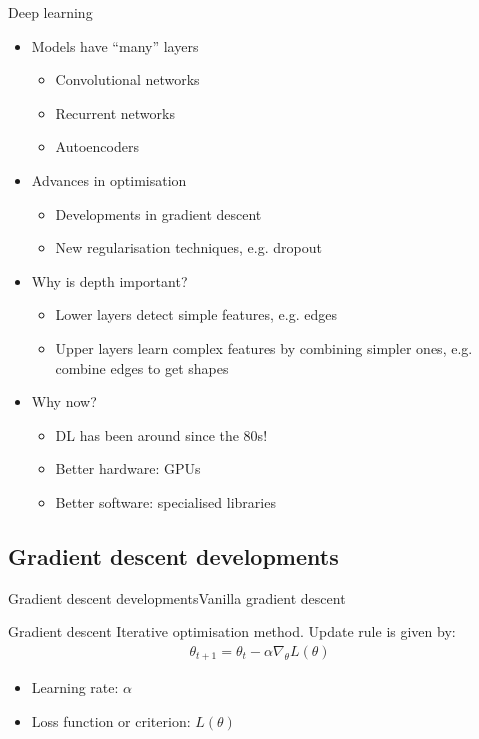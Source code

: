 \documentclass[handout]{beamer}
\theoremstyle{definition}
\theoremstyle{remark}
\begin{document}
\begin{frame}{Deep learning}
\begin{itemize}
    \item{
        Models have ``many'' layers \pause
        \begin{itemize}
          \item Convolutional networks \pause
          \item Recurrent networks \pause
          \item Autoencoders \pause 
        \end{itemize}
    }
    \item{
        Advances in optimisation \pause
        \begin{itemize}
          \item Developments in gradient descent \pause
          \item New regularisation techniques, e.g. dropout \pause
        \end{itemize}
    }
    \item{
        Why is depth important?
        \begin{itemize}
            \item{ Lower layers detect simple features, e.g. edges \pause }
            \item{ Upper layers learn complex features by combining simpler ones, e.g. combine edges to get shapes \pause }
        \end{itemize}
    }
    
    \item{ Why now?
        \begin{itemize}
            \item{ DL has been around since the 80s! \pause}
            \item{ Better hardware: GPUs \pause}
            \item{ Better software: specialised libraries}
        \end{itemize}
    }
\end{itemize}  
\end{frame}

\subsection{Gradient descent developments}
\begin{frame}{Gradient descent developments}{Vanilla gradient descent}
  \begin{block}{Gradient descent}
  Iterative optimisation method. Update rule is given by:
  \begin{align*}
      \theta_{t+1} = \theta_t - \alpha\nabla_\theta L(\theta)
  \end{align*}
  \begin{itemize}
      \item Learning rate: $\alpha$
      \item Loss function or criterion: $L(\theta)$
  \end{itemize} 
  \end{block} 
\end{frame}
\end{document}
